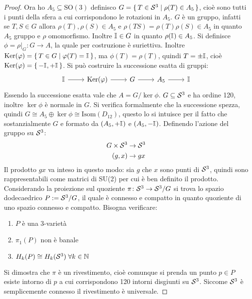 \begin{proof}
  Ora ho $ A_5 \subseteq \mathrm{SO(3)} $ definisco
  $ G = \set{ T \in \mathcal{S}^{3} | \rho(T) \in A_5} $, cioè sono tutti i punti della sfera a
  cui corrispondono le rotazioni in $ A_5 $. $ G $ è un gruppo, infatti se
  $ T, S \in G $ allora $ \rho(T), \rho(S) \in A_5 $ e
  $ \rho(TS) = \rho(T)\rho(S) \in A_5 $ in quanto $ A_5 $ gruppo e $ \rho $ omomorfismo.
  Inoltre $ \mathbb{I}_{} \in G $ in quanto $ \rho(\mathbb{I}_{}) \in A_5 $. Si definisce
  $ \phi = \rho \lvert_G \colon G \to A $, la quale per costruzione è suriettiva. Inoltre
  $ \mathrm{Ker}( \varphi) = \set{ T \in G | \varphi(T) = \mathbb{I}_{}} $, ma $ \phi(T) = \rho(T) $, quindi
  $ T = \pm \mathbb{I}_{} $, cioè $ \mathrm{Ker}( \varphi) = \set{- \mathbb{I}_{}, + \mathbb{I}_{}} $. Si può costruire
  la successione esatta di gruppi:
  \[
    \begin{tikzcd}
      \Id{} \arrow{r}{} & \ker{\phi} \arrow{r}{} & G \arrow{r}{} & A_5 \arrow{r}{} & \Id{}
    \end{tikzcd}
  \]
  Essendo la successione esatta vale che $ A = {G} \slash {\ker{\phi}} $.
  $ G \subseteq \mathcal{S}^{3} $ e ha ordine 120, inoltre $ \ker{\phi} $ è normale in
  $ G $. Si verifica formalmente che la successione spezza, quindi
  $ G \cong A_5 \oplus \ker{\phi} \cong \mathrm{Isom}(D_{12}) $, questo lo si intuisce per il fatto che sostanzialmente
  $ G $ e formato da $ (A_5, + \mathbb{I}_{}) $ e $ (A_5, - \mathbb{I}_{}) $.
  Definendo l'azione del gruppo su $ \mathcal{S}^{3} $:
  \begin{align*}
    G \times \mathcal{S}^{3} & \to \mathcal{S}^{3} \\
    (g,x) & \to gx
  \end{align*}
  Il prodotto $ gx $ va inteso in questo modo: sia $ g $ che $ x $ sono punti di
  $ \mathcal{S}^{3} $, quindi sono rappresentabili come matrici di SU(2) per cui è ben
  definito il prodotto. Considerando la proiezione sul quoziente
  $ \pi \colon \mathcal{S}^{3} \to {\mathcal{S}^{3}} \slash {G} $ si trova lo spazio dodecaedrico
  $ P := {\mathcal{S}^{3}} \slash {G} $, il quale è connesso e compatto in quanto quoziente
  di uno spazio connesso e compatto. Bisogna verificare:
  \begin{enumerate}
  \item $ P $ è una $ 3 $-varietà
  \item $ \pi_1(P) $ non è banale
  \item $ H_k(P) \cong H_k(\mathcal{S}^{3}) \; \forall k \in \mathbb{N}$
  \end{enumerate}
  Si dimostra che $ \pi $ è un rivestimento, cioè comunque si prenda un punto $ p \in P $
  esiste intorno di $ p $ a cui corrispondono 120 intorni disgiunti su $ \mathcal{S}^{3} $.
  Siccome $ \mathcal{S}^{3} $ è semplicemente connesso il rivestimento è universale.

\end{proof}
